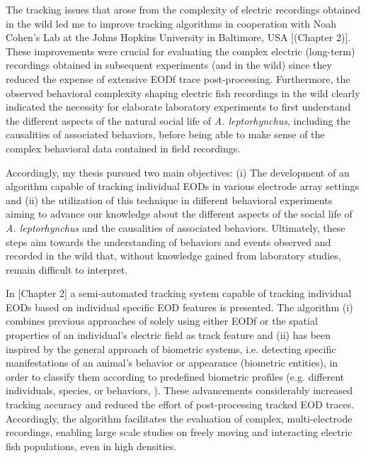 \documentclass[11pt,pdftex]{article}
\newcommand{\note}[2][]{\textcolor{red!80!black}{[\textbf{\ifthenelse{\equal{#1}{}}{}{#1: }}#2]}}
\newcommand{\notetr}[1]{\note[TR]{#1}}
\newcommand{\lepto}{\textit{A. leptorhynchus}}
\begin{document}
The tracking issues that arose from the complexity of electric recordings obtained in the wild led me to improve tracking algorithms in cooperation with Noah Cohen's Lab at the Johns Hopkins University in Baltimore, USA \notetr{(Chapter 2)}. These improvements were crucial for evaluating the complex electric (long-term) recordings obtained in subsequent experiments (and in the wild) since they reduced the expense of extensive EODf trace post-processing. Furthermore, the observed behavioral complexity shaping electric fish recordings in the wild clearly indicated the necessity for elaborate laboratory experiments to first understand the different aspects of the natural social life of \lepto{}, including the causalities of associated behaviors, before being able to make sense of the complex behavioral data contained in field recordings. 

Accordingly, my thesis pursued two main objectives: (i) The development of an algorithm capable of tracking individual EODs in various electrode array settings and (ii) the utilization of this technique in different behavioral experiments aiming to advance our knowledge about the different aspects of the social life of \lepto{} and the causalities of associated behaviors. Ultimately, these steps aim towards the understanding of behaviors and events observed and recorded in the wild that, without knowledge gained from laboratory studies, remain difficult to interpret.

In \notetr{Chapter 2} a semi-automated tracking system capable of tracking individual EODs based on individual specific EOD features is presented. The algorithm (i) combines previous approaches of solely using either EODf \citep{Henninger2020} or the spatial properties of an individual's electric field \citep{Madhav2018} as track feature and (ii) has been inspired by the general approach of biometric systems, i.e. detecting specific manifestations of an animal's behavior or appearance (biometric entities), in order to classify them according to predefined biometric profiles (e.g. different individuals, species, or behaviors, \citealp{Kuhl2013}). These advancements considerably increased tracking accuracy and reduced the effort of post-processing tracked EOD traces. Accordingly, the algorithm facilitates the evaluation of complex, multi-electrode recordings, enabling large scale studies on freely moving and interacting electric fish populations, even in high densities. 
\end{document}
